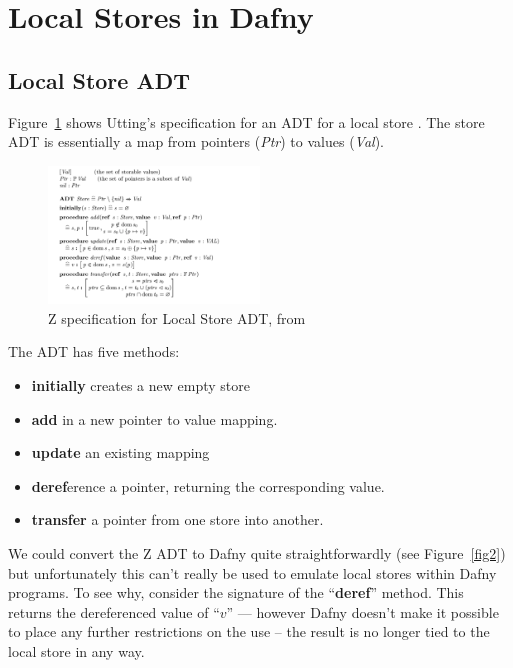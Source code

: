 \section{Local Stores in Dafny}

\subsection{Local Store ADT}

Figure~\ref{fig1} shows Utting's specification for an ADT for a local
store \cite{utting1995,utting1998}.  The store ADT is essentially a
map from pointers (\textit{Ptr}) to values (\textit{Val}).

\begin{figure}[t]
\centering
\includegraphics[width=0.5\textwidth]{LocalStoreADT.pdf}
\caption{Z specification for Local Store ADT, from
  \citet{utting1995,utting1998}}
\label{fig1}
\end{figure}

The ADT has five methods:
\begin{itemize}
\item \textbf{initially} creates a new empty store
\item \textbf{add} in a new pointer to value mapping.
\item \textbf{update} an existing mapping
\item \textbf{deref}erence a pointer, returning the corresponding
  value.
\item \textbf{transfer} a pointer from one store into another.
\end{itemize}

We could convert the Z ADT to Dafny quite straightforwardly (see
Figure~\ref{fig2}) but unfortunately this can't really be used to
emulate local stores within Dafny programs.  To see why, consider the
signature of the ``\textbf{deref}'' method. This returns the
dereferenced value of ``$v$'' --- however Dafny doesn't make it
possible to place any further restrictions on the use -- the result is
no longer tied to the local store in any way.

